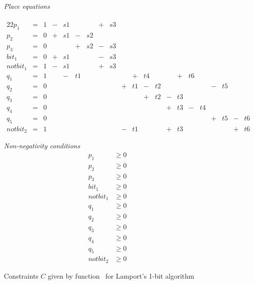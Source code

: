 \begin{figure}
  \begin{minipage}{.79\columnwidth}
    \emph{Place equations} \\ \\[-2em]
    \begin{alignat*}{22}
         p_1   &{}={}& 1 &{}-{}& s1 &     &    &{}+{}& s3 &&&&&&&&&&&&& \\[-0.4em]
         p_2   &{}={}& 0 &{}+{}& s1 &{}-{}& s2 &     &    &&&&&&&&&&&&& \\[-0.4em]
         p_3   &{}={}& 0 &     &    &{}+{}& s2 &{}-{}& s3 &&&&&&&&&&&&& \\[-0.4em]
         bit_1 &{}={}& 0 &{}+{}& s1 &     &    &{}-{}& s3 &&&&&&&&&&&&& \\[-0.4em]
    notbit_1 &{}={}& 1 &{}-{}& s1 &     &    &{}+{}& s3 &&&&&&&&&&&&& \\[-0.4em]
         q_1   &{}={}& 1 &&{}-{}& t1 &     &    &     &    &{}+{}& t4 &     &    &{}+{}& t6 & \\[-0.4em]
         q_2   &{}={}& 0 &&&&&&&{}+{}& t1 &{}-{}& t2 &     &    &     &    &{}-{}& t5 &     &    & \\[-0.4em]
         q_3   &{}={}& 0 &&&&&&&     &    &{}+{}& t2 &{}-{}& t3 &     &    &     &    &     &    & \\[-0.4em]
         q_4   &{}={}& 0 &&&&&&&     &    &     &    &{}+{}& t3 &{}-{}& t4 &     &    &     &    & \\[-0.4em]
         q_5   &{}={}& 0 &&&&&&&     &    &     &    &     &    &     &    &{}+{}& t5 &{}-{}& t6 & \\[-0.4em]
    notbit_2 &{}={}& 1 &&&&&&&{}-{}& t1 &     &    &{}+{}& t3 &     &    &     &    &{}+{}& t6 &
    \end{alignat*}
  \end{minipage}
  \begin{minipage}{.19\columnwidth}
    \emph{Non-negativity conditions} \\[-2em]
    \begin{align*}
         p_1   & \ge 0 \\[-0.4em]
         p_2   & \ge 0 \\[-0.4em]
         p_3   & \ge 0 \\[-0.4em]
         bit_1 & \ge 0 \\[-0.4em]
      notbit_1 & \ge 0 \\[-0.4em]
         q_1   & \ge 0 \\[-0.4em]
         q_2   & \ge 0 \\[-0.4em]
         q_3   & \ge 0 \\[-0.4em]
         q_4   & \ge 0 \\[-0.4em]
         q_5   & \ge 0 \\[-0.4em]
      notbit_2 & \ge 0
    \end{align*}
  \end{minipage}
\caption{Constraints $C$ given by function \safety\ for
         Lamport's 1-bit algorithm}
\label{fig:setC}
\end{figure}
